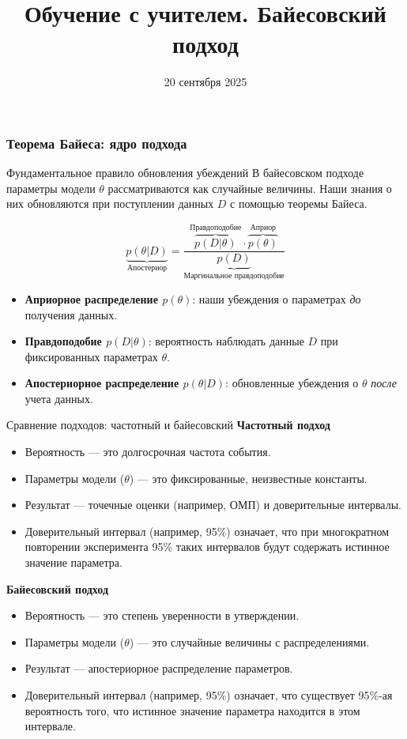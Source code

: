 \documentclass[notheorems, handout]{beamer}
\title[Статистическое и машинное обучение]{Обучение с учителем. Байесовский подход}
\institute[Санкт-Петербургский Государственный Университет]{%
	\small
	Санкт-Петербургский государственный университет\\
	Кафедра статистического моделирования
}
\date{20 сентября 2025}
\begin{document}
\begin{frame}
	\titlepage
\end{frame}\begin{frame}
  \frametitle{Теорема Байеса: ядро подхода}
  \begin{block}{Фундаментальное правило обновления убеждений}
    В байесовском подходе параметры модели $\theta$ рассматриваются как случайные величины. Наши знания о них обновляются при поступлении данных $D$ с помощью теоремы Байеса.
  \end{block}
  \begin{equation*}
    \underbrace{p(\theta | D)}_{\text{Апостериор}} = \frac{\overbrace{p(D | \theta)}^{\text{Правдоподобие}} \cdot \overbrace{p(\theta)}^{\text{Априор}}}{\underbrace{p(D)}_{\text{Маргинальное правдоподобие}}}
  \end{equation*}
  \begin{itemize}
    \item \textbf{Априорное распределение $p(\theta)$}: наши убеждения о параметрах \textit{до} получения данных.
    \item \textbf{Правдоподобие $p(D | \theta)$}: вероятность наблюдать данные $D$ при фиксированных параметрах $\theta$.
    \item \textbf{Апостериорное распределение $p(\theta | D)$}: обновленные убеждения о $\theta$ \textit{после} учета данных.
  \end{itemize}
\end{frame}

\begin{frame}{Сравнение подходов: частотный и байесовский}
        \textbf{Частотный подход}
        \begin{itemize}
            \item Вероятность --- это долгосрочная частота события.
            \item Параметры модели ($\theta$) --- это фиксированные, неизвестные константы.
            \item Результат --- точечные оценки (например, ОМП) и доверительные интервалы.
            \item Доверительный интервал (например, 95\%) означает, что при многократном повторении эксперимента 95\% таких интервалов будут содержать истинное значение параметра.
        \end{itemize}
        \textbf{Байесовский подход}
        \begin{itemize}
            \item Вероятность --- это степень уверенности в утверждении.
            \item Параметры модели ($\theta$) --- это случайные величины с распределениями.
            \item Результат --- апостериорное распределение параметров.
            \item Доверительный интервал (например, 95\%) означает, что существует 95\%-ая вероятность того, что истинное значение параметра находится в этом интервале.
        \end{itemize}
\end{frame}
\end{document}
